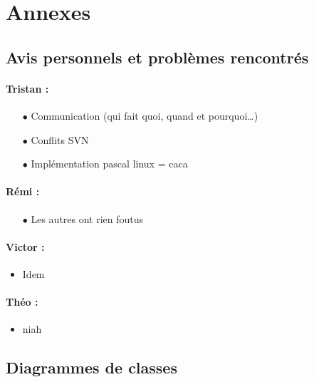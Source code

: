 \section{Annexes}
\subsection{Avis personnels et problèmes rencontrés}
\paragraph{Tristan :}
\begin{itemize}
\item[$\bullet$]Communication (qui fait quoi, quand et pourquoi\dots )
\item[$\bullet$]Conflits SVN
\item[$\bullet$]Implémentation pascal linux = caca
\end{itemize}
\paragraph{Rémi :}
\begin{itemize}
\item[$\bullet$] Les autres ont rien foutus
\end{itemize}
\paragraph{Victor :}
\begin{itemize}
\item Idem
\end{itemize}

\paragraph{Théo :}
\begin{itemize}
\item niah
\end{itemize}

\newpage
\subsection{Diagrammes de classes}

